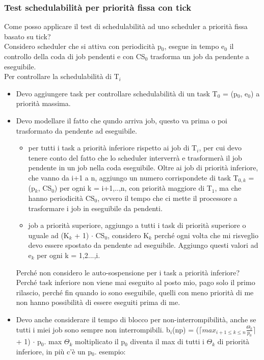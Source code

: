 \documentclass[12pt, oneside]{extbook}
\begin{document}
\subsubsection{Test schedulabilità per priorità fissa con tick}
Come posso applicare il test di schedulabilità ad uno scheduler a priorità fissa basato su tick?\\ Considero scheduler che si attiva con periodicità p$_{0}$, esegue in tempo e$_{0}$ il controllo della coda di job pendenti e con CS$_{0}$ trasforma un job da pendente a eseguibile.\\  Per controllare la schedulabilità di T$_{i}$
\begin{itemize}
\item Devo aggiungere task per controllare schedulabilità di un task T$_{0}$ = (p$_{0}$, e$_{0}$) a priorità massima.
\item Devo modellare il fatto che qundo arriva job, questo va prima o poi trasformato da pendente ad eseguibile. 
\begin{itemize}
\item per tutti i task a priorità inferiore rispetto ai job di T$_{i}$, per cui devo tenere conto del fatto che lo scheduler interverrà e trasformerà il job pendente in un job nella coda eseguibile. Oltre ai job di priorità inferiore, che vanno da i+1 a n, aggiungo un numero corrispondete di task T$_{0,k}$ = (p$_{k}$, CS$_{0}$) per ogni k = i+1,..,n, con priorità maggiore di T$_{1}$, ma che hanno periodicità CS$_{0}$, ovvero il tempo che ci mette il processore a trasformare i job in eseguibile da pendenti.
\item job a priorità superiore, aggiungo a tutti i task di priorità superiore o uguale ad (K$_{k}$ + 1) $\cdot$ CS$_{0}$, considero K$_{k}$ perché ogni volta che mi risveglio devo essere spostato da pendente ad eseguibile. Aggiungo questi valori ad e$_{k}$ per ogni k = 1,2...,i.
\end{itemize}
Perché non considero le auto-sospensione per i task a priorità inferiore? Perché task inferiore non viene mai eseguito al posto mio, pago solo il primo rilascio, perché fin quando io sono eseguibile, quelli con meno priorità di me non hanno possibilità di essere eseguiti prima di me.
\item Devo anche considerare il tempo di blocco per non-interrompibilità, anche se tutti i miei job sono sempre non interrompibili. b$_{i}$(np) = ($\lceil max_{i+1 \leq k \leq n}\frac{\Theta_{k}}{p_{0}}\rceil$ + 1) $\cdot$ p$_{0}$. max $\Theta_{k}$ moltiplicato il p$_{0}$ diventa il max di tutti i $\Theta_{k}$ di priorità inferiore, in più c'è un p$_{0}$. esempio:\\

\end{itemize}
\end{document}
